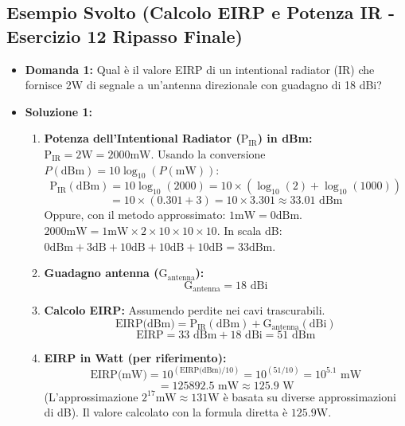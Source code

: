 \subsection{Esempio Svolto (Calcolo EIRP e Potenza IR - Esercizio 12 Ripasso Finale)}
\begin{itemize}
    \item \textbf{Domanda 1:} Qual è il valore EIRP di un intentional radiator (IR) che fornisce 2W di segnale a un'antenna direzionale con guadagno di 18 dBi?
    \item \textbf{Soluzione 1:}
    \begin{enumerate}
        \item \textbf{Potenza dell'Intentional Radiator ($\text{P}_{\text{IR}}$) in dBm:}
        $\text{P}_{\text{IR}} = 2\text{W} = 2000\text{mW}$.
        Usando la conversione $P(\text{dBm}) = 10 \log_{10}(P(\text{mW}))$:
        \[ \text{P}_{\text{IR}}(\text{dBm}) = 10 \log_{10}(2000) = 10 \times (\log_{10}(2) + \log_{10}(1000)) \]
        \[ = 10 \times (0.301 + 3) = 10 \times 3.301 \approx 33.01 \text{ dBm} \]
        Oppure, con il metodo approssimato: $1\text{mW} = 0\text{dBm}$. $2000\text{mW} = 1\text{mW} \times 2 \times 10 \times 10 \times 10$.
        In scala dB: $0\text{dBm} + 3\text{dB} + 10\text{dB} + 10\text{dB} + 10\text{dB} = 33\text{dBm}$.
        \item \textbf{Guadagno antenna ($\text{G}_{\text{antenna}}$):}
        \[ \text{G}_{\text{antenna}} = 18 \text{ dBi} \]
        \item \textbf{Calcolo EIRP:}
        Assumendo perdite nei cavi trascurabili.
        \[ \text{EIRP(dBm)} = \text{P}_{\text{IR}}(\text{dBm}) + \text{G}_{\text{antenna}}(\text{dBi}) \]
        \[ \text{EIRP} = 33 \text{ dBm} + 18 \text{ dBi} = 51 \text{ dBm} \]
        \item \textbf{EIRP in Watt (per riferimento):}
        \[ \text{EIRP(mW)} = 10^{(\text{EIRP(dBm)}/10)} = 10^{(51/10)} = 10^{5.1} \text{ mW} \]
        \[ = 125892.5 \text{ mW} \approx 125.9 \text{ W} \]
        (L'approssimazione $2^{17} \text{mW} \approx 131 \text{W}$ è basata su diverse approssimazioni di dB). Il valore calcolato con la formula diretta è $125.9 \text{W}$.
    \end{enumerate}


\end{itemize}
